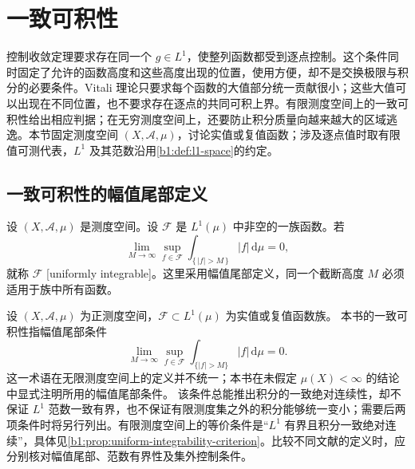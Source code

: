 \section{一致可积性}
\label{b1:sec:0505}

控制收敛定理要求存在同一个 \(g\in L^1\)，使整列函数都受到逐点控制。这个条件同时固定了允许的函数高度和这些高度出现的位置，使用方便，却不是交换极限与积分的必要条件。Vitali 理论只要求每个函数的大值部分统一贡献很小；这些大值可以出现在不同位置，也不要求存在逐点的共同可积上界。有限测度空间上的一致可积性给出相应判据；在无穷测度空间上，还要防止积分质量向越来越大的区域逃逸。本节固定测度空间 \((X,\mathcal A,\mu)\)，讨论实值或复值函数；涉及逐点值时取有限值可测代表，\(L^1\) 及其范数沿用\cref{b1:def:l1-space}的约定。


\subsection{一致可积性的幅值尾部定义}
\label{b1:subsec:050501}

\begin{definition}
\label{b1:def:uniform-integrability}
设 \((X,\mathcal A,\mu)\) 是测度空间。设 \(\mathcal F\) 是 \(L^1(\mu)\) 中非空的一族函数。若
\[
\lim_{M\to\infty}\sup_{f\in\mathcal F}
\int_{\{\,|f|>M\,\}}|f|\,\mathrm d\mu=0,
\]
就称 \(\mathcal F\) [uniformly integrable]。这里采用幅值尾部定义，同一个截断高度 \(M\) 必须适用于族中所有函数。
\end{definition}

\begin{remark}[本书的一致可积性约定]
\label{b1:rem:uniform-integrability-convention}
设 \((X,\mathcal A,\mu)\) 为正测度空间，\(\mathcal F\subset L^1(\mu)\) 为实值或复值函数族。
本书的一致可积性指幅值尾部条件
\[
 \lim_{M\to\infty}\sup_{f\in\mathcal F}
          \int_{\{|f|>M\}}|f|\,\mathrm d\mu=0.
\]
这一术语在无限测度空间上的定义并不统一；本书在未假定 \(\mu(X)<\infty\) 的结论中显式注明所用的幅值尾部条件。
该条件总能推出积分的一致绝对连续性，却不保证 \(L^1\) 范数一致有界，也不保证有限测度集之外的积分能够统一变小；需要后两项条件时将另行列出。有限测度空间上的等价条件是“\(L^1\) 有界且积分一致绝对连续”，具体见\cref{b1:prop:uniform-integrability-criterion}。比较不同文献的定义时，应分别核对幅值尾部、范数有界性及集外控制条件。
\end{remark}

